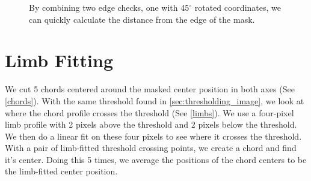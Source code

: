 \documentclass[10pt]{scrartcl}
\begin{document}
\begin{figure}[!ht]
{\begin{subfloatrow}
{        }
        {
        \label{aborder}
        }
    \end{subfloatrow}
}
{\caption{By combining two edge checks, one with 45$^\circ$ rotated coordinates, we can quickly calculate the distance from the edge of the mask.}
\label{cuttingcorners}
}
\end{figure}

\section{Limb Fitting} %
\label{sec:limb_fitting}

We cut 5 chords centered around the masked center position in both axes (See \cref{chords}). With the same threshold found in \cref{sec:thresholding_image}, we look at where the chord profile crosses the threshold (See \cref{limbs}). We use a four-pixel limb profile with 2 pixels above the threshold and 2 pixels below the threshold. We then do a linear fit on these four pixels to see where it crosses the threshold. With a pair of limb-fitted threshold crossing points, we create a chord and find it's center. Doing this 5 times, we average the positions of the chord centers to be the limb-fitted center position. 
\end{document}
